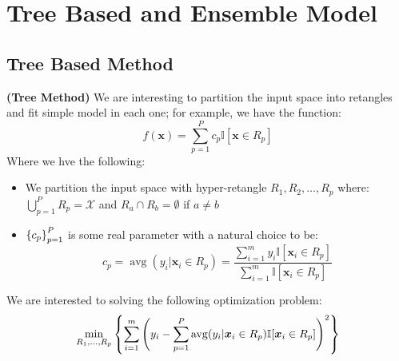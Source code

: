 \section{Tree Based and Ensemble Model}

\subsection{Tree Based Method}

\begin{definition}{\textbf{(Tree Method)}}
    We are interesting to partition the input space into retangles and fit simple model in each one; for example, we have the function:
    \begin{equation*}
        f(\boldsymbol x) = \sum^P_{p=1}c_p \mathbb{I}[\boldsymbol x \in R_p]
    \end{equation*}
    Where we hve the following:
    \begin{itemize}
        \item We partition the input space with hyper-retangle $R_1,R_2,\dots,R_p$ where: $\bigcup^P_{p=1} R_p = \mathcal{X}$ and $R_a\cap R_b = \emptyset$ if $a\ne b$
        \item $\left\{ c_p \right\}^P_{p=1}$ is some real parameter with a natural choice to be:
        \begin{equation*}
            c_p = \operatorname{avg}(y_i | \boldsymbol x_i \in R_p) = \frac{\sum^m_{i=1} y_i \mathbb{I}[\boldsymbol x_i \in R_p]}{\sum^m_{i=1} \mathbb{I}[\boldsymbol x_i \in R_p]}
        \end{equation*}
    \end{itemize}
    We are interested to solving the following optimization problem:
    \begin{equation*}
        \min_{R_1,\dots,R_p}\left\{ \sum^m_{i=1}\left( y_i - \sum^P_{p=1} \operatorname{avg}(y_i | \boldsymbol x_i \in R_p) \mathbb{I}[\boldsymbol x_i \in R_p] \right)^2 \right\}
    \end{equation*}
\end{definition}

